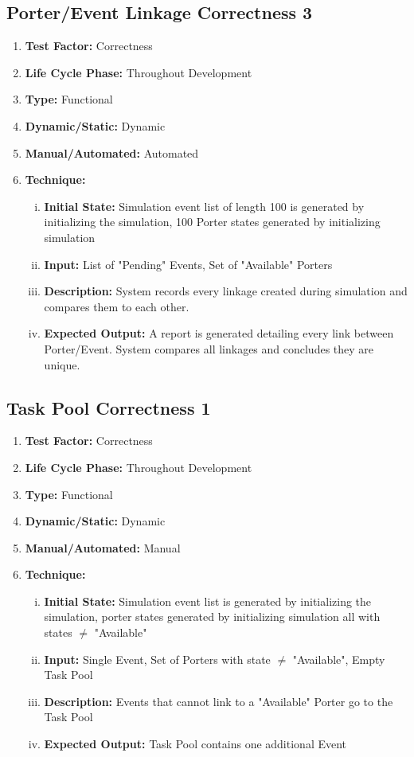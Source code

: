 \documentclass[paper=letter, fontsize=10pt]{scrartcl}
\numberwithin{equation}{section}		%
\numberwithin{figure}{section}			%
\numberwithin{table}{section}				%
\begin{document}
\subsection{Porter/Event Linkage Correctness 3}
\begin{enumerate}[] 	
	\item \textbf{Test Factor:} Correctness 
	\item \textbf{Life Cycle Phase:} Throughout Development
	\item \textbf{Type:} Functional
	\item \textbf{Dynamic/Static:} Dynamic
	\item \textbf{Manual/Automated:} Automated
	\item \textbf{Technique:}
		\begin{enumerate}[(i)]
			\item \textbf{Initial State:} Simulation event list of length 100 is generated by initializing the simulation, 100 Porter states generated by initializing simulation
			\item \textbf{Input:} List of "Pending" Events, Set of "Available" Porters
			\item \textbf{Description:} System records every linkage created during simulation and compares them to each other.
			\item \textbf{Expected Output:} A report is generated detailing every link between Porter/Event. System compares all linkages and concludes they are unique.
		\end{enumerate}
\end{enumerate}

\subsection{Task Pool Correctness 1}
\begin{enumerate}[]
	\item \textbf{Test Factor:} Correctness
	\item \textbf{Life Cycle Phase:} Throughout Development
	\item \textbf{Type:} Functional
	\item \textbf{Dynamic/Static:} Dynamic
	\item \textbf{Manual/Automated:} Manual
	\item \textbf{Technique:}
		\begin{enumerate}[(i)]
			\item \textbf{Initial State:} Simulation event list is generated by initializing the simulation, porter states generated by initializing simulation all with states $\neq$ "Available"
			\item \textbf{Input:} Single Event, Set of Porters with state $\neq$ "Available", Empty Task Pool
			\item \textbf{Description:} Events that cannot link to a "Available" Porter go to the Task Pool
			\item \textbf{Expected Output:} Task Pool contains one additional Event 
		\end{enumerate}
\end{enumerate}
\end{document}
